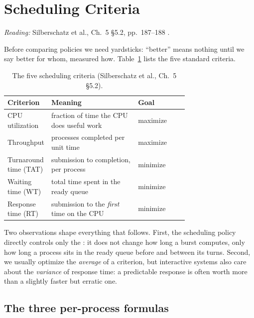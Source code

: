 \documentclass[11pt]{article}
\begin{document}
\section{Scheduling Criteria}
\label{sec:criteria}

\noindent\emph{Reading:} Silberschatz et al., Ch.~5 \S5.2, pp.~187--188
\cite{SilberschatzOSC_operating_system_concepts}.

Before comparing policies we need yardsticks: ``better'' means nothing until we
say better for whom, measured how. Table~\ref{tab:criteria} lists the five
standard criteria.

\begin{table}[h]
\centering
\renewcommand{\arraystretch}{1.25}
\begin{tabular}{>{\raggedright\arraybackslash}p{0.24\linewidth}>{\raggedright\arraybackslash}p{0.48\linewidth}l}
  \toprule
  \textbf{Criterion} & \textbf{Meaning} & \textbf{Goal} \\
  \midrule
  CPU utilization & fraction of time the CPU does useful work & maximize \\
  Throughput & processes completed per unit time & maximize \\
  Turnaround time (TAT) & submission to completion, per process & minimize \\
  Waiting time (WT) & total time spent in the ready queue & minimize \\
  Response time (RT) & submission to the \emph{first} time on the CPU & minimize \\
  \bottomrule
\end{tabular}
\caption{The five scheduling criteria (Silberschatz et al., Ch.~5 \S5.2).}
\label{tab:criteria}
\end{table}

Two observations shape everything that follows. First, the scheduling policy
directly controls only the : it does not change how long a
burst computes, only how long a process sits in the ready queue before and
between its turns. Second, we usually optimize the \emph{average} of a
criterion, but interactive systems also care about the \emph{variance} of
response time: a predictable response is often worth more than a slightly
faster but erratic one.

\subsection*{The three per-process formulas}
\end{document}
